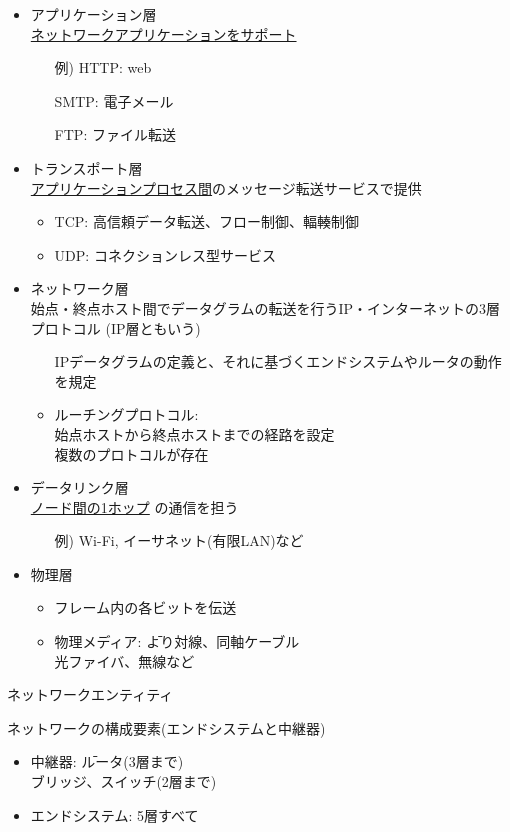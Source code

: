 \begin{itemize}
  \item アプリケーション層\\
    \underline{ネットワークアプリケーションをサポート}
  \begin{itemize}
    \item[例)] HTTP: web
    \item[] SMTP: 電子メール
    \item[] FTP: ファイル転送
  \end{itemize}
  \item トランスポート層\\
    \underline{アプリケーションプロセス間}のメッセージ転送サービスで提供
  \begin{itemize}
    \item TCP: 高信頼データ転送、フロー制御、輻輳制御
    \item UDP: コネクションレス型サービス
  \end{itemize}
  \item ネットワーク層\\
    始点・終点ホスト間でデータグラムの転送を行うIP・インターネットの3層プロトコル (IP層ともいう)
  \begin{itemize}
    \item[] IPデータグラムの定義と、それに基づくエンドシステムやルータの動作を規定
    \item ルーチングプロトコル:\\
      始点ホストから終点ホストまでの経路を設定\\
      複数のプロトコルが存在
    \end{itemize}
  \item データリンク層\\
    \underline{ノード間の1ホップ} の通信を担う
  \begin{itemize}
    \item[例)] Wi-Fi, イーサネット(有限LAN)など
  \end{itemize}
  \item 物理層
  \begin{itemize}
    \item フレーム内の各ビットを伝送
    \item \begin{tabbing}
      物理メディア: \=より対線、同軸ケーブル\\
      \>光ファイバ、無線など
    \end{tabbing}
  \end{itemize}
\end{itemize}

ネットワークエンティティ

\indent\indent ネットワークの構成要素(エンドシステムと中継器)
\begin{itemize}
  \item \begin{tabbing}
    中継器: \=ルータ(3層まで)\\
    \>ブリッジ、スイッチ(2層まで)
  \end{tabbing}
  \item エンドシステム: 5層すべて
\end{itemize}
